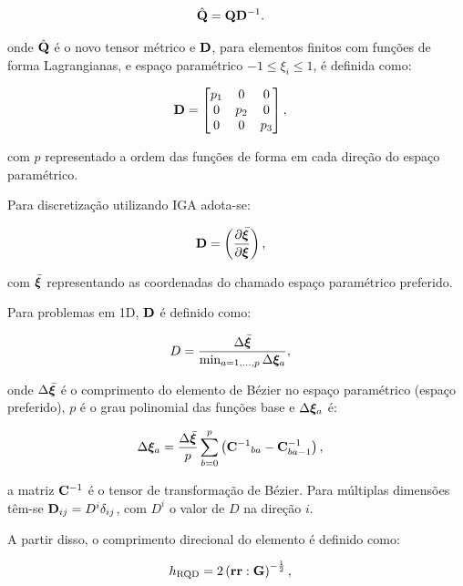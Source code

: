 \documentclass[tese_patricia]{subfiles}%
\begin{document}
\begin{align}
\hat{\mathbf{Q}}&=\mathbf{Q}\mathbf{D}^{-1}.
\end{align}

\noindent onde $\hat{\mathbf{Q}}$ é o novo tensor métrico e $\mathbf{D}$, para elementos finitos com funções de forma Lagrangianas, e espaço paramétrico $-1\leq\xi_i\leq1$, é definida como:

\begin{align}
\mathbf{D}&=\begin{bmatrix}
p_{1} & 0 & 0\\
0 & p_{2} & 0 \\
0 & 0 & p_{3}
\end{bmatrix},
\end{align}

\noindent com $p$ representado a ordem das funções de forma em cada direção do espaço paramétrico. 

Para discretização utilizando IGA adota-se:

\begin{align}
\mathbf{D}&=\left(\frac{\partial\bar{\bm{\xi}}}{\partial\bm{\xi}}\right),
\end{align}

\noindent com $\bar{\bm{\xi}}$ representando as coordenadas do chamado espaço paramétrico preferido. 

Para problemas em 1D, $\mathbf{D}$ é definido como:

\begin{align}
D&=\frac{\Delta\bar{\bm{\xi}}}{\min_{a=1,...,p} \Delta\bm{\xi}_{a}},
\end{align}

\noindent onde $\Delta\bar{\bm{\xi}}$ é o comprimento do elemento de Bézier no espaço paramétrico (espaço preferido), $p$ é o grau polinomial das funções base e $\Delta\bm{\xi}_{a}$ é:

\begin{align}
\Delta\bm{\xi}_{a}&=\frac{\Delta\bar{\bm{\xi}}}{p}\sum_{b=0}^{p} \left({\mathbf{C}^{-1}}_{ba} - \mathbf{C}^{-1}_{ba-1}\right),
\end{align}

\noindent a matriz $\mathbf{C}^{-1}$ é o tensor de transformação de Bézier. Para múltiplas dimensões têm-se $\mathbf{D}_{ij} = D^i \delta_{ij} $, com $D^i$ o valor de $D$ na direção $i$.

A partir disso, o comprimento direcional do elemento é definido como:

\begin{align}
h_{\mathrm{RQD}} &=2\left(\mathbf{r}\mathbf{r} : \mathbf{G} \right)^{-\frac{1}{2}},
\end{align}
\end{document}
